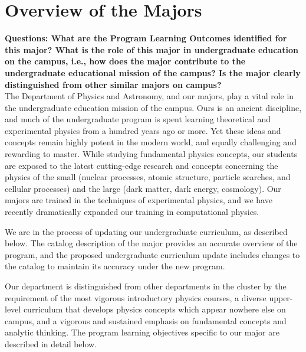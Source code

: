 \documentclass[12pt]{article}
\begin{document}





\tableofcontents

\newpage
\section{Overview of the Majors}
\label{sec:overview}

{\bf Questions: What are the Program Learning Outcomes identified for
  this major? What is the role of this major in undergraduate
  education on the campus, i.e., how does the major contribute to the
  undergraduate educational mission of the campus? Is the major
  clearly distinguished from other similar majors on campus?}\\[3pt]

\noindent
The Department of Physics and Astronomy, and our majors, play a vital
role in the undergraduate education mission of the campus.  Ours is an
ancient discipline, and much of the undergraduate program is spent
learning theoretical and experimental physics from a hundred years ago
or more.  Yet these ideas and concepts remain highly potent in the
modern world, and equally challenging and rewarding to master.  While
studying fundamental physics concepts, our students are exposed to the
latest cutting-edge research and concepts concerning the physics of
the small (nuclear processes, atomic structure, particle searches, and
cellular processes) and the large (dark matter, dark energy,
cosmology).  Our majors are trained in the techniques of experimental
physics, and we have recently dramatically expanded our training in
computational physics.

We are in the process of updating our undergraduate curriculum, as
described below.  The catalog description of the major provides an
accurate overview of the program, and the proposed undergraduate
curriculum update includes changes to the catalog to maintain its
accuracy under the new program.

Our department is distinguished from other departments in the cluster
by the requirement of the most vigorous introductory physics courses,
a diverse upper-level curriculum that develops physics concepts which
appear nowhere else on campus, and a vigorous and sustained emphasis
on fundamental concepts and analytic thinking.  The program learning
objectives specific to our major are described in detail below.\\[3pt]
\end{document}
